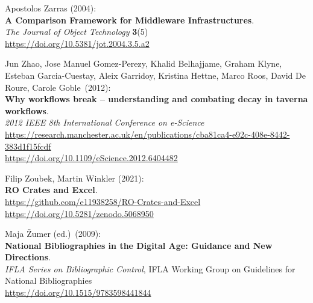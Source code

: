\begin{thebibliography}{9}
Apostolos Zarras (2004): \\
\textbf{A {Comparison Framework} for {Middleware Infrastructures}}. \\
\emph{The Journal of Object Technology} \textbf{3}(5) \\
\url{https://doi.org/10.5381/jot.2004.3.5.a2}

Jun Zhao, Jose Manuel Gomez-Perezy, Khalid Belhajjame, Graham
Klyne, Esteban Garcia-Cuestay, Aleix Garridoy, Kristina Hettne, Marco
Roos, David De Roure, Carole Goble~(2012):\\
\textbf{Why workflows break -- understanding and combating decay in
taverna workflows}.\\
\emph{2012 IEEE 8th International Conference on e-Science}\\
\url{https://research.manchester.ac.uk/en/publications/cba81ca4-e92c-408e-8442-383d1f15fcdf}\\
\url{https://doi.org/10.1109/eScience.2012.6404482}

Filip Zoubek, Martin Winkler (2021):\\
\textbf{RO Crates and Excel}.\\
\url{https://github.com/e11938258/RO-Crates-and-Excel}\\
\url{https://doi.org/10.5281/zenodo.5068950}

Maja Žumer (ed.)~(2009):\\
\textbf{National Bibliographies in the Digital Age: Guidance and New
Directions}.\\
\emph{IFLA Series on Bibliographic Control}, IFLA Working Group on
Guidelines for National Bibliographies\\
\url{https://doi.org/10.1515/9783598441844}


\end{thebibliography}

\makeatother

